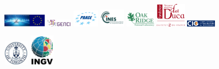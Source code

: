 \documentclass[oneside,english,onecolumn,letterpaper]{book}
\begin{document}
\begin{figure}[htbp]
%
\noindent \begin{centering}
\includegraphics[width=0.190\textwidth]{figures/logo_European_Union}\vspace*{2truemm}
\includegraphics[width=0.112\textwidth]{figures/logo_GENCI}\vspace*{2truemm}
\includegraphics[width=0.112\textwidth]{figures/logo_PRACE}\vspace*{2truemm}
\includegraphics[width=0.112\textwidth]{figures/logo_CINES}\vspace*{2truemm}
\includegraphics[width=0.130\textwidth]{figures/logo_Oak_Ridge}\vspace*{2truemm}
\hspace*{3mm}\includegraphics[width=0.130\textwidth]{figures/logo_fondation_Del_Duca}
\includegraphics[width=0.130\textwidth]{figures/logo_CIG}\vspace*{2truemm}
\par\end{centering}
%
\vspace*{-2truemm}
%
\noindent \begin{centering}
\includegraphics[width=0.112\textwidth]{figures/logo_University_of_Toronto}\vspace*{2truemm}
\includegraphics[width=0.109\textwidth]{figures/logo_INGV}\vspace*{2truemm}

\end{centering}
\end{figure}
\end{document}
